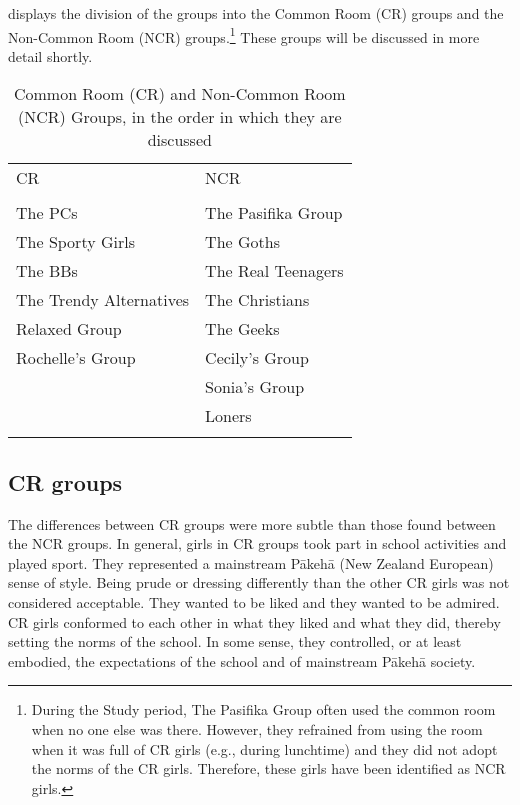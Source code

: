 
 displays the division of the groups into the Common Room (CR) groups and the Non-Common Room (NCR) groups.\footnote{During the Study period, The Pasifika Group often used the common room when no one else was there. However, they refrained from using the room when it was full of CR girls (e.g., during lunchtime) and they did not adopt the norms of the CR girls. Therefore, these girls have been identified as NCR girls.}  These groups will be discussed in more detail shortly.

     
     
\begin{table}[t]
\caption{Common Room (CR) and Non-Com\-mon Room (NCR) Groups, in the or\-der in which they are dis\-cussed}\label{CRNCR}
	 \begin{center}
		\begin{tabular}{ll}\lsptoprule
	
CR&NCR\\
	\\ \midrule
The PCs & The Pasifika Group\\
The Sporty Girls & The Goths\\
The BBs & The Real Teenagers \\
The Trendy Alternatives & The Christians\\
Relaxed Group & The Geeks \\
Rochelle's Group & Cecily's Group\\
 &  Sonia's Group\\
 & Loners \\

\lspbottomrule
		\end{tabular}
	
	\end{center}
\end{table} 

\subsection{CR groups}
\label{group:CR}

The differences between CR groups were more subtle than those found between the NCR groups. In general, girls in CR groups took part in school activities and played sport. They represented a mainstream P\=akeh\=a (New Zealand European) sense of style. Being prude or dressing differently than the other CR girls was not considered acceptable. They wanted to be liked and they wanted to be admired. CR girls conformed to each other in what they liked and what they did, thereby setting the norms of the school. In some sense, they controlled, or at least embodied, the expectations of the school and of mainstream P\=akeh\=a society.

